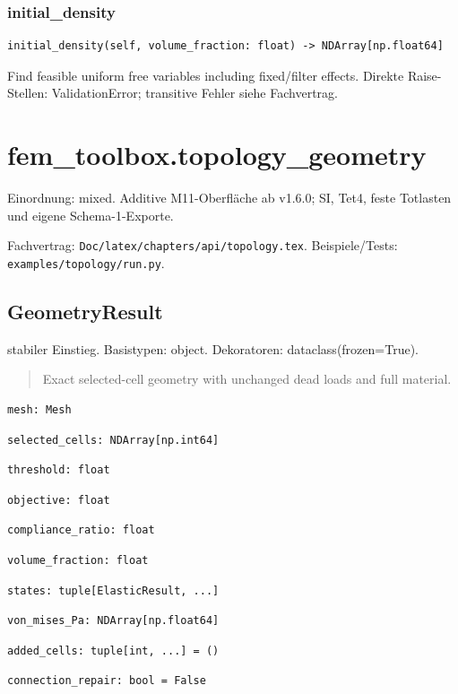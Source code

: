 \subsubsection*{initial\_density}
\begin{lstlisting}
initial_density(self, volume_fraction: float) -> NDArray[np.float64]
\end{lstlisting}
Find feasible uniform free variables including fixed/filter effects.
Direkte Raise-Stellen: ValidationError; transitive Fehler siehe Fachvertrag.
\section{fem\_toolbox.topology\_geometry}
Einordnung: mixed. Additive M11-Oberfläche ab v1.6.0; SI, Tet4, feste Totlasten und eigene Schema-1-Exporte.
\par Fachvertrag: \nolinkurl{Doc/latex/chapters/api/topology.tex}. Beispiele/Tests:
\nolinkurl{examples/topology/run.py}.
\subsection{GeometryResult}
stabiler Einstieg.
Basistypen: object. Dekoratoren: dataclass(frozen=True).
\begin{quote}
Exact selected-cell geometry with unchanged dead loads and full material.
\end{quote}
\begin{lstlisting}
mesh: Mesh
\end{lstlisting}
\begin{lstlisting}
selected_cells: NDArray[np.int64]
\end{lstlisting}
\begin{lstlisting}
threshold: float
\end{lstlisting}
\begin{lstlisting}
objective: float
\end{lstlisting}
\begin{lstlisting}
compliance_ratio: float
\end{lstlisting}
\begin{lstlisting}
volume_fraction: float
\end{lstlisting}
\begin{lstlisting}
states: tuple[ElasticResult, ...]
\end{lstlisting}
\begin{lstlisting}
von_mises_Pa: NDArray[np.float64]
\end{lstlisting}
\begin{lstlisting}
added_cells: tuple[int, ...] = ()
\end{lstlisting}
\begin{lstlisting}
connection_repair: bool = False
\end{lstlisting}
